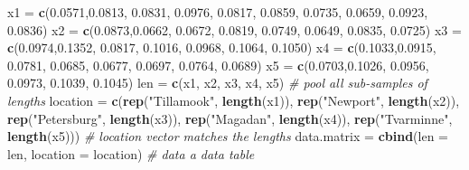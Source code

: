 \documentclass[
]{book}
\newenvironment{Shaded}{\begin{snugshade}}{\end{snugshade}}
\newcommand{\AttributeTok}[1]{\textcolor[rgb]{0.13,0.29,0.53}{#1}}
\newcommand{\CommentTok}[1]{\textcolor[rgb]{0.56,0.35,0.01}{\textit{#1}}}
\newcommand{\FloatTok}[1]{\textcolor[rgb]{0.00,0.00,0.81}{#1}}
\newcommand{\FunctionTok}[1]{\textcolor[rgb]{0.13,0.29,0.53}{\textbf{#1}}}
\newcommand{\NormalTok}[1]{#1}
\newcommand{\OtherTok}[1]{\textcolor[rgb]{0.56,0.35,0.01}{#1}}
\newcommand{\StringTok}[1]{\textcolor[rgb]{0.31,0.60,0.02}{#1}}
\begin{document}
\begin{Shaded}
\begin{Highlighting}[]
\NormalTok{x1 }\OtherTok{=} \FunctionTok{c}\NormalTok{(}\FloatTok{0.0571}\NormalTok{,}\FloatTok{0.0813}\NormalTok{, }\FloatTok{0.0831}\NormalTok{, }\FloatTok{0.0976}\NormalTok{, }\FloatTok{0.0817}\NormalTok{, }\FloatTok{0.0859}\NormalTok{, }\FloatTok{0.0735}\NormalTok{, }\FloatTok{0.0659}\NormalTok{, }
       \FloatTok{0.0923}\NormalTok{, }\FloatTok{0.0836}\NormalTok{) }
\NormalTok{x2 }\OtherTok{=} \FunctionTok{c}\NormalTok{(}\FloatTok{0.0873}\NormalTok{,}\FloatTok{0.0662}\NormalTok{, }\FloatTok{0.0672}\NormalTok{, }\FloatTok{0.0819}\NormalTok{, }\FloatTok{0.0749}\NormalTok{, }\FloatTok{0.0649}\NormalTok{, }\FloatTok{0.0835}\NormalTok{, }\FloatTok{0.0725}\NormalTok{)}
\NormalTok{x3 }\OtherTok{=} \FunctionTok{c}\NormalTok{(}\FloatTok{0.0974}\NormalTok{,}\FloatTok{0.1352}\NormalTok{, }\FloatTok{0.0817}\NormalTok{, }\FloatTok{0.1016}\NormalTok{, }\FloatTok{0.0968}\NormalTok{, }\FloatTok{0.1064}\NormalTok{, }\FloatTok{0.1050}\NormalTok{)}
\NormalTok{x4 }\OtherTok{=} \FunctionTok{c}\NormalTok{(}\FloatTok{0.1033}\NormalTok{,}\FloatTok{0.0915}\NormalTok{, }\FloatTok{0.0781}\NormalTok{, }\FloatTok{0.0685}\NormalTok{, }\FloatTok{0.0677}\NormalTok{, }\FloatTok{0.0697}\NormalTok{, }\FloatTok{0.0764}\NormalTok{, }\FloatTok{0.0689}\NormalTok{)}
\NormalTok{x5 }\OtherTok{=} \FunctionTok{c}\NormalTok{(}\FloatTok{0.0703}\NormalTok{,}\FloatTok{0.1026}\NormalTok{, }\FloatTok{0.0956}\NormalTok{, }\FloatTok{0.0973}\NormalTok{, }\FloatTok{0.1039}\NormalTok{, }\FloatTok{0.1045}\NormalTok{)}
\NormalTok{len  }\OtherTok{=} \FunctionTok{c}\NormalTok{(x1, x2, x3, x4, x5)      }\CommentTok{\# pool all sub{-}samples of lengths}
\NormalTok{location }\OtherTok{=} \FunctionTok{c}\NormalTok{(}\FunctionTok{rep}\NormalTok{(}\StringTok{"Tillamook"}\NormalTok{, }\FunctionTok{length}\NormalTok{(x1)), }
             \FunctionTok{rep}\NormalTok{(}\StringTok{"Newport"}\NormalTok{, }\FunctionTok{length}\NormalTok{(x2)),}
             \FunctionTok{rep}\NormalTok{(}\StringTok{"Petersburg"}\NormalTok{, }\FunctionTok{length}\NormalTok{(x3)),}
             \FunctionTok{rep}\NormalTok{(}\StringTok{"Magadan"}\NormalTok{, }\FunctionTok{length}\NormalTok{(x4)),}
             \FunctionTok{rep}\NormalTok{(}\StringTok{"Tvarminne"}\NormalTok{, }\FunctionTok{length}\NormalTok{(x5))) }\CommentTok{\# location vector matches the lengths}
\NormalTok{data.matrix }\OtherTok{=} \FunctionTok{cbind}\NormalTok{(}\AttributeTok{len =}\NormalTok{  len, }\AttributeTok{location =}\NormalTok{ location)   }\CommentTok{\# data a data table}

\end{Highlighting}
\end{Shaded}
\end{document}
